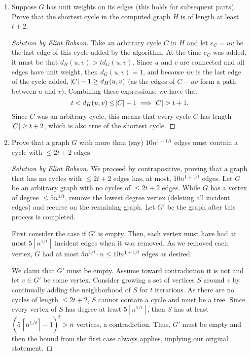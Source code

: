 \documentclass{article}
\newenvironment{solution}[1]{\begin{proof}[Solution by #1]}{\end{proof}}
\newcommand{\ceil}[1]{\left\lceil#1\right\rceil} %
\begin{document}
\begin{enumerate}
    \item Suppose \(G\) has unit weights on its edges (this holds for subsequent parts). Prove that the shortest cycle in the computed graph \(H\) is of length at least \(t + 2\).
    
    \begin{solution}{Eliot Robson}
        Take an arbitrary cycle \(C\) in \(H\) and let \(e_C = uv\) be the last edge of this cycle added by the algorithm. At the time \(e_C\) was added, it must be that \(d_H (u,v) > t d_G(u, v)\). Since \(u\) and \(v\) are connected and all edges have unit weight, then \(d_G(u,v) = 1\), and because \(uv\) is the last edge of the cycle added, \(\abs{C}-1 \geq d_H(u,v)\) (as the edges of \(C - uv\) form a path between \(u\) and \(v\)). Combining these expressions, we have that
        \[
            t < d_H(u,v) \leq \abs{C} - 1
            \implies
            \abs{C} > t+1.
        \]
        Since \(C\) was an arbitrary cycle, this means that every cycle \(C\) has length \(\abs{C} \geq t+2\), which is also true of the shortest cycle.
    \end{solution}

    \item Prove that a graph \(G\) with more than (say) \(10 n^{1 + 1/t}\) edges must contain a cycle with \(\leq 2 t + 2\) edges.
    
    \begin{solution}{Eliot Robson}
        We proceed by contrapositive, proving that a graph that has no cycles with \(\leq 2t + 2\) edges has, at most, \(10 n^{1 + 1/t}\) edges. Let \(G\) be an arbitrary graph with no cycles of \(\leq 2t + 2\) edges. While \(G\) has a vertex of degree \(\leq 5 n^{1/t}\), remove the lowest degree vertex (deleting all incident edges) and recurse on the remaining graph. Let \(G'\) be the graph after this process is completed.
        
        First consider the case if \(G'\) is empty. Then, each vertex must have had at most \(5 \ceil{n^{1/t}}\) incident edges when it was removed. As we removed each vertex, \(G\) had at most \(5 n^{1/t} \cdot n \leq 10 n^{1 + 1/t}\) edges as desired.
        
        We claim that \(G'\) must be empty. Assume toward contradiction it is not and let \(v \in G'\) be some vertex. Consider growing a set of vertices \(S\) around \(v\) by continually adding the neighborhood of \(S\) for \(t\) iterations. As there are no cycles of length \(\leq 2t + 2\), \(S\) cannot contain a cycle and must be a tree. Since every vertex of \(S\) has degree at least \(5 \ceil{n^{1/t}}\), then \(S\) has at least \(\del{5 \ceil{n^{1/t}} - 1}^t > n\) vertices, a contradiction. Thus, \(G'\) must be empty and then the bound from the first case always applies, implying our original statement.
    \end{solution}


\end{enumerate}
\end{document}
